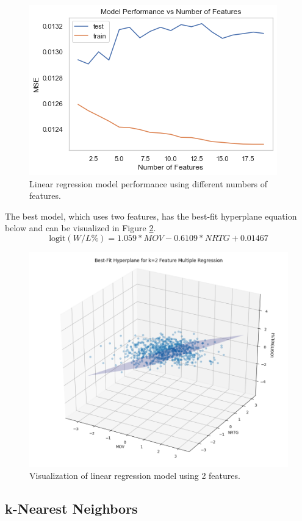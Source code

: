 \documentclass[pageno]{jpaper}
\begin{document}
\begin{figure}[hbt]
\centering
\includegraphics[width=0.75\linewidth]{featureselect.png}
\caption{Linear regression model performance using different numbers of features.}
\label{fig:featureselect}
\end{figure}

The best model, which uses two features, has the best-fit hyperplane equation below and can be visualized in Figure \ref{fig:bestlinear}. $$\text{logit}\left(W/L\%\right) = 1.059 * MOV - 0.6109 * NRTG + 0.01467$$

\begin{figure}[hbt]
\centering
\includegraphics[width=0.75\linewidth]{bestlinear.png}
\caption{Visualization of linear regression model using 2 features.}
\label{fig:bestlinear}
\end{figure}

\newpage 

\subsection{k-Nearest Neighbors}
\end{document}
